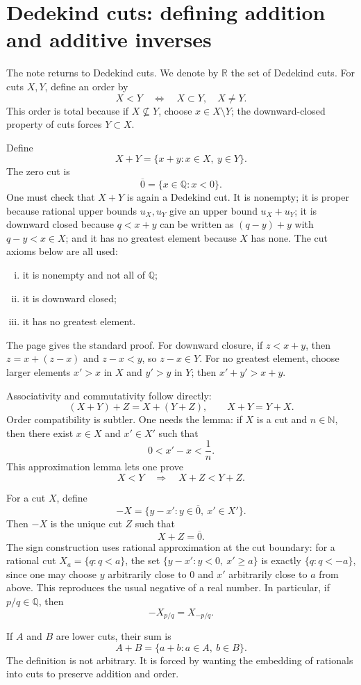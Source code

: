 \section{Dedekind cuts: defining addition and additive inverses}

The note returns to Dedekind cuts.  We denote by \(\mathbb R\) the set of Dedekind cuts.  For cuts \(X,Y\), define an order by
\[
  X<Y\quad\Longleftrightarrow\quad X\subset Y,\quad X\neq Y.
\]
This order is total because if \(X\not\subseteq Y\), choose \(x\in X\setminus Y\); the downward-closed property of cuts forces \(Y\subset X\).

Define
\[
  X+Y=\{x+y:x\in X,\ y\in Y\}.
\]
The zero cut is
\[
  \overline0=\{x\in\mathbb Q:x<0\}.
\]
One must check that \(X+Y\) is again a Dedekind cut. It is nonempty; it is proper because rational upper bounds \(u_X,u_Y\) give an upper bound \(u_X+u_Y\); it is downward closed because \(q<x+y\) can be written as \((q-y)+y\) with \(q-y<x\in X\); and it has no greatest element because \(X\) has none. The cut axioms below are all used:
\begin{enumerate}[(i)]
  \item it is nonempty and not all of \(\mathbb Q\);
  \item it is downward closed;
  \item it has no greatest element.

\end{enumerate}
The page gives the standard proof.  For downward closure, if \(z<x+y\), then \(z=x+(z-x)\) and \(z-x<y\), so \(z-x\in Y\).  For no greatest element, choose larger elements \(x'>x\) in \(X\) and \(y'>y\) in \(Y\); then \(x'+y'>x+y\).

Associativity and commutativity follow directly:
\[
  (X+Y)+Z=X+(Y+Z),\qquad X+Y=Y+X.
\]
Order compatibility is subtler.  One needs the lemma: if \(X\) is a cut and \(n\in\mathbb N\), then there exist \(x\in X\) and \(x'\in X'\) such that
\[
  0<x'-x<\frac1n.
\]
This approximation lemma lets one prove
\[
  X<Y\quad\Rightarrow\quad X+Z<Y+Z.
\]

For a cut \(X\), define
\[
  -X=\{y-x':y\in\overline0,\ x'\in X'\}.
\]
Then \(-X\) is the unique cut \(Z\) such that
\[
  X+Z=\overline0.
\]
The sign construction uses rational approximation at the cut boundary: for a rational cut \(X_a=\{q:q<a\}\), the set \(\{y-x':y<0,\ x'\ge a\}\) is exactly \(\{q:q<-a\}\), since one may choose \(y\) arbitrarily close to \(0\) and \(x'\) arbitrarily close to \(a\) from above. This reproduces the usual negative of a real number.  In particular, if \(p/q\in\mathbb Q\), then
\[
  -X_{p/q}=X_{-p/q}.
\]

If \(A\) and \(B\) are lower cuts, their sum is
\[
  A+B=\{a+b:a\in A,\ b\in B\}.
\]
The definition is not arbitrary.  It is forced by wanting the embedding of rationals into cuts to preserve addition and order.

